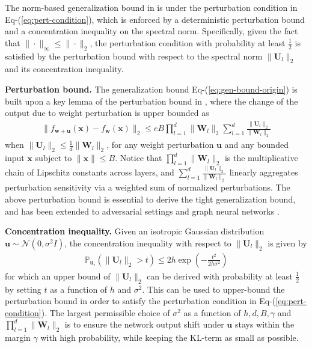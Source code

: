 \documentclass[journal]{IEEEtran} %
\def\eqref#1{Eq-(\ref{#1})}
\def\vu{{\bm{u}}}
\def\vw{{\bm{w}}}
\def\vx{{\bm{x}}}
\def\mU{{\bm{U}}}
\def\mW{{\bm{W}}}
\newcommand{\Norm}[1]{\|#1\|}
\begin{document}
The norm-based generalization bound in \cite[Lemma 1]{neyshabur2018pac} is under the perturbation condition in \eqref{eq:pert-condition}, which is enforced by a deterministic perturbation bound and a concentration inequality on the spectral norm.
Specifically, given the fact that $\Norm{\cdot}_\infty \le \Norm{\cdot}_2$, the perturbation condition with probability at least $\frac{1}{2}$ is satisfied by the perturbation bound with respect to the spectral norm $\Norm{\mU_l}_2$ and its concentration inequality.

\textbf{Perturbation bound.}
The generalization bound \eqref{eq:gen-bound-origin} is built upon a key lemma of the perturbation bound in \cite[Lemma 2]{neyshabur2018pac}, where the change of the output due to weight perturbation is upper bounded as
\begin{align} \label{eq:pert-bound-origin}
    \Norm{f_{\vw+\vu}(\vx)-f_{\vw}(\vx)}_2 \le e B \prod_{l=1}^d \|\mW_l\|_2 \sum_{l=1}^d \frac{\|\mU_l\|_2}{\|\mW_l\|_2}
\end{align}
when $\|\mU_l\|_2 \le \frac{1}{d}\|\mW_l\|_2$, for any weight perturbation $\vu$ and any bounded input $\vx$ subject to $\Norm{\vx}\le B$. 
Notice that $\prod_{l=1}^d \|\mW_l\|_2$ is the multiplicative chain of Lipschitz constants across layers, and $\sum_{l=1}^d \frac{\|\mU_l\|_2}{\|\mW_l\|_2}$ linearly aggregates perturbation sensitivity via a weighted sum of normalized perturbations.
The above perturbation bound is essential to derive the tight generalization bound, and has been extended to adversarial settings \cite{xiao2023pac,jin2022enhancing,11027475} and graph neural networks \cite{liao2020pac,ju2023generalization,brilliantov2024compositional}.

\textbf{Concentration inequality.}
Given an isotropic Gaussian distribution $\vu \sim \mathcal{N}(0,\sigma^2 I)$, the concentration inequality with respect to $\|\mU_l\|_2$ is given by
\begin{align}
    \mathbb{P}_{\vu_i}(\Norm{\mU_l}_2 > t) \le 2 h \exp\left({-\frac{t^2}{2h\sigma^2}}\right)
\end{align}
for which an upper bound of $\|\mU_l\|_2$ can be derived with probability at least $\frac{1}{2}$ by setting $t$ as a function of $h$ and $\sigma^2$. This can be used to upper-bound the perturbation bound in order to satisfy the perturbation condition in \eqref{eq:pert-condition}. The largest permissible choice of $\sigma^2$ as a function of $h,d,B,\gamma$ and $\prod_{l=1}^d \Norm{\mW_l}_2$ is to ensure the network output shift under $\vu$ stays within the margin $\gamma$ with high probability, while keeping the KL-term as small as possible.
\end{document}
